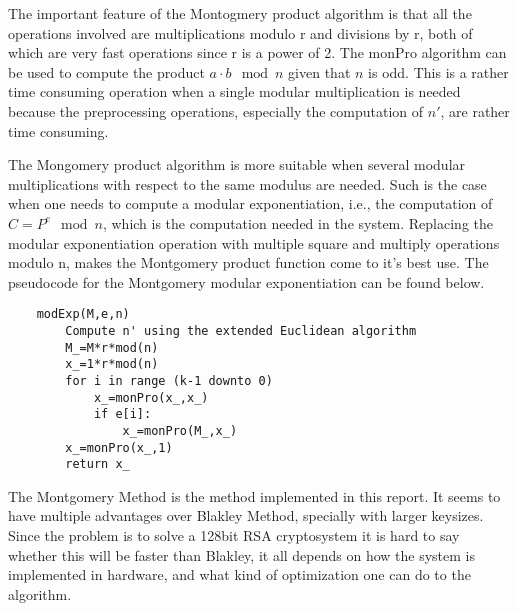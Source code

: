 %
The important feature of the Montogmery product algorithm is that all the operations involved are multiplications modulo r and divisions by r, both of which are very fast operations since r is a power of 2. The monPro algorithm can be used to compute the product $a \cdot b \mod{n}$ given that $n$ is odd. This is a rather time consuming operation when a single modular multiplication is needed because the preprocessing operations, especially the computation of $n'$, are rather time consuming.

The Mongomery product algorithm is more suitable when several modular multiplications with respect to the same modulus are needed. Such is the case when one needs to compute a modular exponentiation, i.e., the computation of $C=P^e\mod{n}$, which is the computation needed in the system. Replacing the modular exponentiation operation with multiple square and multiply operations modulo n, makes the Montgomery product function come to it's best use. The pseudocode for the Montgomery modular exponentiation can be found below.
\begin{lstlisting}
    modExp(M,e,n) 
        Compute n' using the extended Euclidean algorithm
        M_=M*r*mod(n)
        x_=1*r*mod(n)
        for i in range (k-1 downto 0)
            x_=monPro(x_,x_)
            if e[i]:
                x_=monPro(M_,x_)
        x_=monPro(x_,1)
        return x_
\end{lstlisting}
%
The Montgomery Method is the method implemented in this report. It seems to have multiple advantages over Blakley Method, specially with larger keysizes. Since the problem is to solve a 128bit RSA cryptosystem it is hard to say whether this will be faster than Blakley, it all depends on how the system is implemented in hardware, and what kind of optimization one can do to the algorithm. 
%
